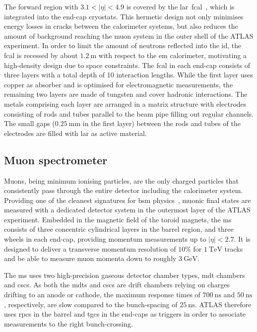 The forward region with $3.1 < \vert\eta\vert <4.9$ is covered by the \gls{lar}~\gls{fcal}~\cite{Aad:2008zzm}, which is integrated into the end-cap cryostats.
This hermetic design not only minimises energy losses in cracks between the calorimeter systems, but also reduces the amount of background reaching the muon system in the outer shell of the ATLAS experiment.
In order to limit the amount of neutrons reflected into the \gls{id}, the \gls{fcal} is recessed by about $\SI{1.2}{\meter}$ with respect to the \gls{em} calorimeter, motivating a high-density design due to space constraints.
The \gls{fcal} in each end-cap consists of three layers with a total depth of 10 interaction lengths. 
While the first layer uses copper as absorber and is optimised for electromagnetic measurements, the remaining two layers are made of tungsten and cover hadronic interactions.
The metals comprising each layer are arranged in a matrix structure with electrodes consisting of rods and tubes parallel to the beam pipe filling out regular channels.
The small gaps ($\SI{0.25}{\milli\meter}$ in the first layer) between the rods and tubes of the electrodes are filled with \gls{lar} as active material.

\subsection{Muon spectrometer}

Muons, being minimum ionising particles, are the only charged particles that consistently pass through the entire detector including the calorimeter system.
Providing one of the cleanest signatures for \gls{bsm} physics~\cite{Brock:1354959}, muonic final states are measured with a dedicated detector system in the outermost layer of the ATLAS experiment.
Embedded in the magnetic field of the toroid magnets, the \gls{ms}~\cite{Aad:2008zzm} consists of three concentric cylindrical layers in the barrel region, and three wheels in each end-cap, providing momentum measurements up to $\vert\eta\vert <2.7$. It is designed to deliver a transverse momentum resolution of $10\%$ for $\SI{1}{\TeV}$ tracks and be able to measure muon momenta down to roughly $\SI{3}{\GeV}$.

The \gls{ms} uses two high-precision gaseous detector chamber types, \gls{mdt} chambers and \glspl{csc}. As both the \glspl{mdt} and \glspl{csc} are drift chambers relying on charges drifting to an anode or cathode, the maximum response times of $\SI{700}{\nano\second}$ and $\SI{50}{\nano\second}$, respectively, are slow compared to the bunch-spacing of $\SI{25}{\nano\second}$. ATLAS therefore uses \glspl{rpc} in the barrel and \glspl{tgc} in the end-caps as triggers in order to associate measurements to the right bunch-crossing.  


